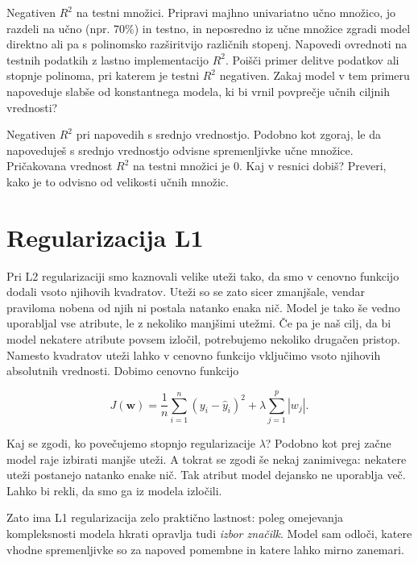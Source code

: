 \begin{exercise}{Negativen $R^2$ na testni množici.}
Pripravi majhno univariatno učno množico, jo razdeli na učno (npr. 70\%) in testno, in neposredno iz učne množice zgradi model direktno ali pa s polinomsko razširitvijo različnih stopenj. Napovedi ovrednoti na testnih podatkih z lastno implementacijo $R^2$. Poišči primer delitve podatkov ali stopnje polinoma, pri katerem je testni $R^2$ negativen. Zakaj model v tem primeru napoveduje slabše od konstantnega modela, ki bi vrnil povprečje učnih ciljnih vrednosti?
\end{exercise}

\begin{exercise}{Negativen $R^2$ pri napovedih s srednjo vrednostjo.}
    Podobno kot zgoraj, le da napoveduješ s srednjo vrednostjo odvisne spremenljivke učne množice. Pričakovana vrednost $R^2$ na testni množici je 0. Kaj v resnici dobiš? Preveri, kako je to odvisno od velikosti učnih množic.
\end{exercise}
    

\section{Regularizacija L1}

Pri L2 regularizaciji smo kaznovali velike uteži tako, da smo v cenovno funkcijo dodali vsoto njihovih kvadratov. Uteži so se zato sicer zmanjšale, vendar praviloma nobena od njih ni postala natanko enaka nič. Model je tako še vedno uporabljal vse atribute, le z nekoliko manjšimi utežmi. Če pa je naš cilj, da bi model nekatere atribute povsem izločil, potrebujemo nekoliko drugačen pristop. Namesto kvadratov uteži lahko v cenovno funkcijo vključimo vsoto njihovih absolutnih vrednosti. Dobimo cenovno funkcijo

\[
J(\mathbf{w}) =
\frac{1}{n} \sum_{i=1}^{n} (y_i - \hat{y}_i)^2
+
\lambda \sum_{j=1}^{p} |w_j|.
\]

Kaj se zgodi, ko povečujemo stopnjo regularizacije $\lambda$? Podobno kot prej začne model raje izbirati manjše uteži. A tokrat se zgodi še nekaj zanimivega: nekatere uteži postanejo natanko enake nič. Tak atribut model dejansko ne uporablja več. Lahko bi rekli, da smo ga iz modela izločili.

Zato ima L1 regularizacija zelo praktično lastnost: poleg omejevanja kompleksnosti modela hkrati opravlja tudi \emph{izbor značilk}. Model sam odloči, katere vhodne spremenljivke so za napoved pomembne in katere lahko mirno zanemari.


